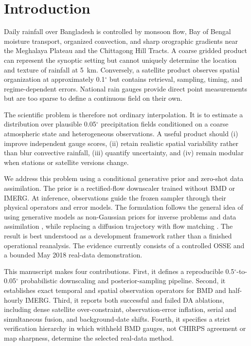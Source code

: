 \documentclass[10pt,twocolumn]{article}
\begin{document}
\section{Introduction}

Daily rainfall over Bangladesh is controlled by monsoon flow, Bay of Bengal moisture transport, organized convection, and sharp orographic gradients near the Meghalaya Plateau and the Chittagong Hill Tracts. A coarse gridded product can represent the synoptic setting but cannot uniquely determine the location and texture of rainfall at 5~km. Conversely, a satellite product observes spatial organization at approximately 0.1$^\circ$ but contains retrieval, sampling, timing, and regime-dependent errors. National rain gauges provide direct point measurements but are too sparse to define a continuous field on their own.

The scientific problem is therefore not ordinary interpolation. It is to estimate a distribution over plausible 0.05$^\circ$ precipitation fields conditioned on a coarse atmospheric state and heterogeneous observations. A useful product should (i) improve independent gauge scores, (ii) retain realistic spatial variability rather than blur convective rainfall, (iii) quantify uncertainty, and (iv) remain modular when stations or satellite versions change.

We address this problem using a conditional generative prior and zero-shot data assimilation. The prior is a rectified-flow downscaler trained without BMD or IMERG. At inference, observations guide the frozen sampler through their physical operators and error models. The formulation follows the general idea of using generative models as non-Gaussian priors for inverse problems and data assimilation \cite{rozet2023,manshausen2025}, while replacing a diffusion trajectory with flow matching \cite{lipman2023,albergo2023}. The result is best understood as a development framework rather than a finished operational reanalysis. The evidence currently consists of a controlled OSSE and a bounded May 2018 real-data demonstration.

This manuscript makes four contributions. First, it defines a reproducible 0.5$^\circ$-to-0.05$^\circ$ probabilistic downscaling and posterior-sampling pipeline. Second, it establishes exact temporal and spatial observation operators for BMD and half-hourly IMERG. Third, it reports both successful and failed DA ablations, including dense satellite over-constraint, observation-error inflation, serial and simultaneous fusion, and background-date shifts. Fourth, it specifies a strict verification hierarchy in which withheld BMD gauges, not CHIRPS agreement or map sharpness, determine the selected real-data method.
\end{document}
